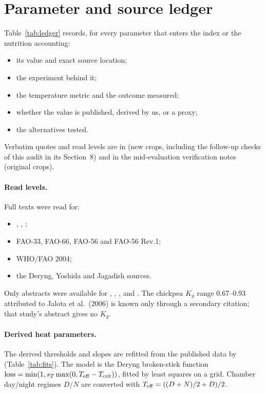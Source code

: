 \section{Parameter and source ledger}\label{app:ledger}
Table~\ref{tab:ledger} records, for every parameter that enters the index or the nutrition accounting:
\begin{itemize}
\item its value and exact source location;
\item the experiment behind it;
\item the temperature metric and the outcome measured;
\item whether the value is published, derived by us, or a proxy;
\item the alternatives tested.
\end{itemize}
Verbatim quotes and read levels are in  (new crops, including the
follow-up checks of this audit in its Section~8) and in the mid-evaluation verification notes (original crops).

\paragraph{Read levels.} Full texts were read for:
\begin{itemize}
\item \citet{bhandari2020}, \citet{boote2005}, \citet{tari2022};
\item FAO-33, FAO-66, FAO-56 and FAO-56 Rev.1;
\item WHO/FAO 2004;
\item the Deryng, Yoshida and Jagadish sources.
\end{itemize}
Only abstracts were available for \citet{prasad2002bean}, \citet{prasad2003peanut}, \citet{morrison2002},
\citet{nandi2021} and \citet{istanbulluoglu2010}. The chickpea $K_y$ range 0.67--0.93 attributed to Jalota et al.\
(2006) is known only through a secondary citation; that study's abstract gives no $K_y$.

\paragraph{Derived heat parameters.} The derived thresholds and slopes are refitted from the published data by
\file{code/25\_parameter\_fits.py} (Table~\ref{tab:fits}). The model is the Deryng broken-stick function
$\text{loss} = \min(1, s_T\max(0,T_{\mathrm{eff}}-T_{\mathrm{crit}}))$, fitted by least squares on a grid. Chamber day/night regimes
$D/N$ are converted with $T_{\mathrm{eff}} = ((D+N)/2 + D)/2$.

